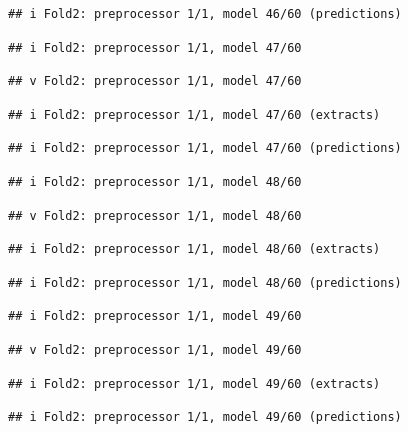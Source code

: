 \documentclass[
]{article}
\begin{document}
\begin{verbatim}
## i Fold2: preprocessor 1/1, model 46/60 (predictions)
\end{verbatim}

\begin{verbatim}
## i Fold2: preprocessor 1/1, model 47/60
\end{verbatim}

\begin{verbatim}
## v Fold2: preprocessor 1/1, model 47/60
\end{verbatim}

\begin{verbatim}
## i Fold2: preprocessor 1/1, model 47/60 (extracts)
\end{verbatim}

\begin{verbatim}
## i Fold2: preprocessor 1/1, model 47/60 (predictions)
\end{verbatim}

\begin{verbatim}
## i Fold2: preprocessor 1/1, model 48/60
\end{verbatim}

\begin{verbatim}
## v Fold2: preprocessor 1/1, model 48/60
\end{verbatim}

\begin{verbatim}
## i Fold2: preprocessor 1/1, model 48/60 (extracts)
\end{verbatim}

\begin{verbatim}
## i Fold2: preprocessor 1/1, model 48/60 (predictions)
\end{verbatim}

\begin{verbatim}
## i Fold2: preprocessor 1/1, model 49/60
\end{verbatim}

\begin{verbatim}
## v Fold2: preprocessor 1/1, model 49/60
\end{verbatim}

\begin{verbatim}
## i Fold2: preprocessor 1/1, model 49/60 (extracts)
\end{verbatim}

\begin{verbatim}
## i Fold2: preprocessor 1/1, model 49/60 (predictions)
\end{verbatim}
\end{document}
